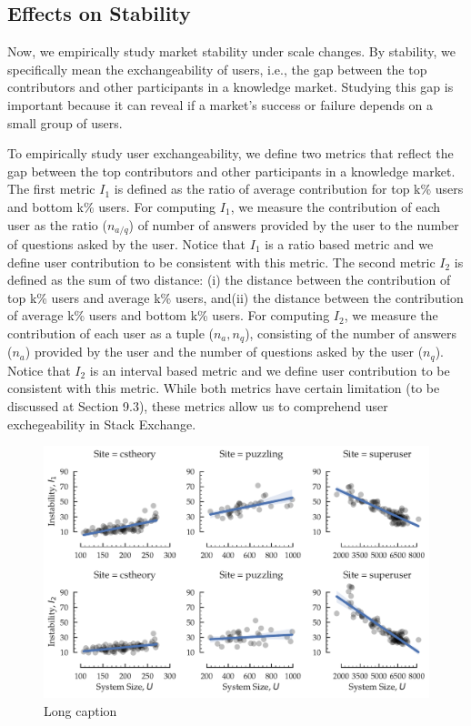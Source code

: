 \subsection{Effects on Stability}
Now, we empirically study market stability under scale changes. By stability, we specifically mean the exchangeability of users, i.e., the gap between the top contributors and other participants in a knowledge market. Studying this gap is important because it can reveal if a market's success or failure depends on a small group of users.  

To empirically study user exchangeability, we define two metrics that reflect the gap between the top contributors and other participants in a knowledge market. The first metric $I_1$ is defined as the ratio of average contribution for top k\% users and bottom k\% users. For computing $I_1$, we measure the contribution of each user as the ratio ($n_{a/q}$) of number of answers provided by the user to the number of questions asked by the user. Notice that $I_1$ is a ratio based metric and we define user contribution to be consistent with this metric. The second metric $I_2$ is defined as the sum of two distance: (i) the distance between the contribution of top k\% users and average k\% users, and(ii) the distance between the contribution of average k\% users and bottom k\% users. For computing $I_2$, we measure the contribution of each user as a tuple ($n_a, n_q$), consisting of the number of answers ($n_a$) provided by the user and the number of questions asked by the user ($n_q$). Notice that $I_2$ is an interval based metric and we define user contribution to be consistent with this metric. While both metrics have certain limitation (to be discussed at Section 9.3), these metrics allow us to comprehend user exchegeability in Stack Exchange.

\begin{figure}[hbt]
\vspace{-0.5\baselineskip}
\centering
\includegraphics[scale=0.38]{Figures/Size_vs_Instability.pdf}
\vspace{-2\baselineskip}
\caption{Long caption}
\vspace{-\baselineskip}
\label{fig:stability}
\end{figure}

